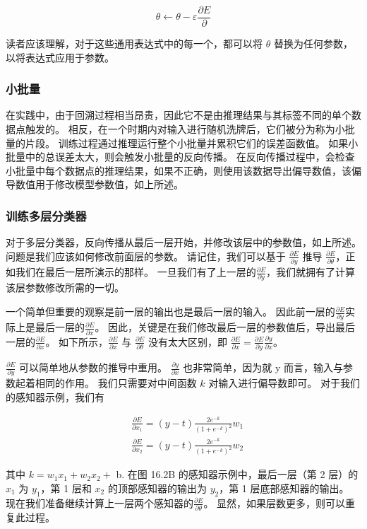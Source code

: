 $$
\theta \leftarrow \theta-\varepsilon \frac{\partial E}{\partial}
$$

读者应该理解，对于这些通用表达式中的每一个，都可以将 $\theta$ 替换为任何参数，以将表达式应用于参数。

\subsubsection{小批量}
在实践中，由于回溯过程相当昂贵，因此它不是由推理结果与其标签不同的单个数据点触发的。 相反，在一个时期内对输入进行随机洗牌后，它们被分为称为小批量的片段。 训练过程通过推理运行整个小批量并累积它们的误差函数值。 如果小批量中的总误差太大，则会触发小批量的反向传播。 在反向传播过程中，会检查小批量中每个数据点的推理结果，如果不正确，则使用该数据导出偏导数值，该偏导数值用于修改模型参数值，如上所述。

\subsubsection{训练多层分类器}
对于多层分类器，反向传播从最后一层开始，并修改该层中的参数值，如上所述。 问题是我们应该如何修改前面层的参数。 请记住，我们可以基于 $\frac{\partial E}{\partial y}$ 推导 $\frac{\partial E}{\partial \theta}$，正如我们在最后一层所演示的那样。 一旦我们有了上一层的$\frac{\partial E}{\partial y}$，我们就拥有了计算该层参数修改所需的一切。

一个简单但重要的观察是前一层的输出也是最后一层的输入。 因此前一层的$\frac{\partial E}{\partial y}$实际上是最后一层的$\frac{\partial E}{\partial x}$。 因此，关键是在我们修改最后一层的参数值后，导出最后一层的$\frac{\partial E}{\partial x}$。 如下所示，$\frac{\partial E}{\partial x}$ 与 $\frac{\partial E}{\partial \theta}$ 没有太大区别，即 $\frac{\partial E}{\partial x}=\frac{\partial E}{\partial y}\frac{\partial y}{\partial x}$。

$\frac{\partial E}{\partial y}$ 可以简单地从参数的推导中重用。 $\frac{\partial y}{\partial x}$ 也非常简单，因为就 $\mathrm{y}$ 而言，输入与参数起着相同的作用。 我们只需要对中间函数 $k$ 对输入进行偏导数即可。 对于我们的感知器示例，我们有

$$
\begin{aligned}
& \frac{\partial E}{\partial x_{1}}=(y-t) \frac{2 e^{-k}}{\left(1+e^{-k}\right)^{2} } w_{1} \\
& \frac{\partial E}{\partial x_{2}}=(y-t) \frac{2 e^{-k}}{\left(1+e^{-k}\right)^{2} } w_{2}
\end{aligned}
$$

其中 $k=w_{1} x_{1}+w_{2} x_{2}+$ b. 在图 16.2B 的感知器示例中，最后一层（第 2 层）的 $x_{1}$ 为 $y_{1}$，第 1 层和 $x_{2}$ 的顶部感知器的输出为 $y_ {2}$，第 1 层底部感知器的输出。 现在我们准备继续计算上一层两个感知器的$\frac{\partial E}{\partial \theta}$。 显然，如果层数更多，则可以重复此过程。

